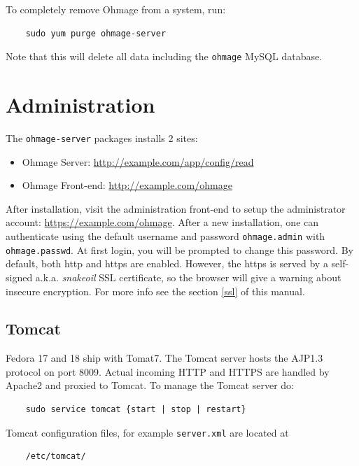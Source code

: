 \documentclass{scrartcl}
\begin{document}
To completely remove Ohmage from a system, run:

\begin{verbatim}
    sudo yum purge ohmage-server
\end{verbatim}
Note that this will delete all data including the \texttt{ohmage} MySQL
database.

\section{Administration}

The \texttt{ohmage-server} packages installs 2 sites:

\begin{itemize}
  \item Ohmage Server: \url{http://example.com/app/config/read}
  \item Ohmage Front-end: \url{http://example.com/ohmage}
\end{itemize}

\noindent After installation, visit the administration front-end to setup the
administrator account: \url{https://example.com/ohmage}. After a new
installation, one can authenticate using the default username and password
\texttt{ohmage.admin} with \texttt{ohmage.passwd}. At first login, you will be
prompted to change this password. By default, both http and https are enabled.
However, the https is served by a self-signed a.k.a. \emph{snakeoil} SSL
certificate, so the browser will give a warning about insecure encryption.
For more info see the section \ref{ssl} of this manual.

\subsection{Tomcat}

Fedora 17 and 18 ship with Tomat7. The Tomcat server hosts the AJP1.3 protocol
on port 8009. Actual incoming HTTP and HTTPS are handled by Apache2 and proxied
to Tomcat. To manage the Tomcat server do:

\begin{verbatim}
    sudo service tomcat {start | stop | restart}
\end{verbatim}

Tomcat configuration files, for example \texttt{server.xml} are located at

\begin{verbatim}
    /etc/tomcat/
\end{verbatim}
\end{document}
